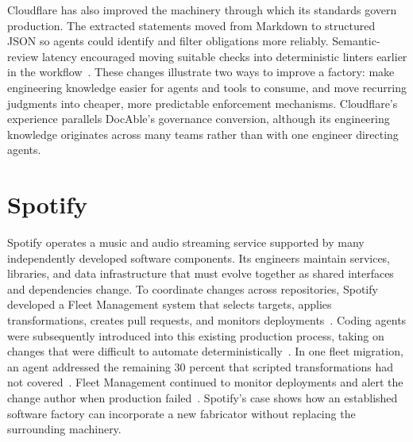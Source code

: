 Cloudflare has also improved the machinery through which its standards govern production. The extracted statements moved from Markdown to structured JSON so agents could identify and filter obligations more reliably. Semantic-review latency encouraged moving suitable checks into deterministic linters earlier in the workflow~\citep{reimann2026codex}. These changes illustrate two ways to improve a factory: make engineering knowledge easier for agents and tools to consume, and move recurring judgments into cheaper, more predictable enforcement mechanisms. Cloudflare's experience parallels DocAble's governance conversion, although its engineering knowledge originates across many teams rather than with one engineer directing agents.

\section{Spotify}\label{heading:spotify}


Spotify operates a music and audio streaming service supported by many independently developed software components. Its engineers maintain services, libraries, and data infrastructure that must evolve together as shared interfaces and dependencies change. To coordinate changes across repositories, Spotify developed a Fleet Management system that selects targets, applies transformations, creates pull requests, and monitors deployments~\citep{brown2023fleet}. Coding agents were subsequently introduced into this existing production process, taking on changes that were difficult to automate deterministically~\citep{charas2025honk}. In one fleet migration, an agent addressed the remaining 30 percent that scripted transformations had not covered~\citep{charas2025honk}. Fleet Management continued to monitor deployments and alert the change author when production failed~\citep{brown2023fleet}. Spotify's case shows how an established software factory can incorporate a new fabricator without replacing the surrounding machinery.


